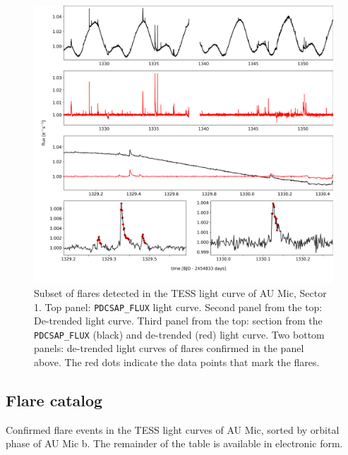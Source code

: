 \documentclass[fleqn,usenatbib]{mnras}%
\begin{document}
\begin{figure}
\includegraphics[width=\hsize]{figures/aumic_illustrate_flares.png} 
\caption{Subset of flares detected in the TESS light curve of AU Mic, Sector 1. Top panel: \texttt{PDCSAP\_FLUX} light curve. Second panel from the top: De-trended light curve. Third panel from the top: section from the \texttt{PDCSAP\_FLUX} (black) and de-trended (red) light curve. Two bottom panels: de-trended light curves of flares confirmed in the panel above. The red dots indicate the data points that mark the flares.}
\label{fig:illustrate_detrend}
\end{figure}

\subsection{Flare catalog}
\label{sec:flarecatalog}
\begin{table}
\caption{Confirmed flare events in the TESS light curves of AU Mic, sorted by orbital phase of AU Mic b. The remainder of the table is available in electronic form.}
\centering

\label{tab:flares}
\end{table}
\end{document}
